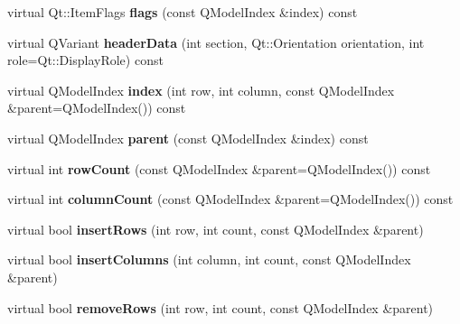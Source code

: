 \begin{DoxyCompactItemize}
virtual Qt\+::\+Item\+Flags {\bfseries flags} (const Q\+Model\+Index \&index) const
\item 
\mbox{\label{class_extendable_item_model_a5ad119a5b156acf0b8ae4090e8ec72ce}} 
virtual Q\+Variant {\bfseries header\+Data} (int section, Qt\+::\+Orientation orientation, int role=Qt\+::\+Display\+Role) const
\item 
\mbox{\label{class_extendable_item_model_ae296561b96cb7d302d27d90a8743e911}} 
virtual Q\+Model\+Index {\bfseries index} (int row, int column, const Q\+Model\+Index \&parent=Q\+Model\+Index()) const
\item 
\mbox{\label{class_extendable_item_model_a5ea988b185fb922797fb153ac284516f}} 
virtual Q\+Model\+Index {\bfseries parent} (const Q\+Model\+Index \&index) const
\item 
\mbox{\label{class_extendable_item_model_a850c9252fb6b59d3e481e564e1c89a60}} 
virtual int {\bfseries row\+Count} (const Q\+Model\+Index \&parent=Q\+Model\+Index()) const
\item 
\mbox{\label{class_extendable_item_model_a25cdc83a4bb99ee802aa1b8533e0775e}} 
virtual int {\bfseries column\+Count} (const Q\+Model\+Index \&parent=Q\+Model\+Index()) const
\item 
\mbox{\label{class_extendable_item_model_adff898fac861b1cc06783b1b5f810d36}} 
virtual bool {\bfseries insert\+Rows} (int row, int count, const Q\+Model\+Index \&parent)
\item 
\mbox{\label{class_extendable_item_model_aa00ea86bd42efb9e82e08da187b6c7ec}} 
virtual bool {\bfseries insert\+Columns} (int column, int count, const Q\+Model\+Index \&parent)
\item 
\mbox{\label{class_extendable_item_model_a066c457590916ebd1fb9e9694415c988}} 
virtual bool {\bfseries remove\+Rows} (int row, int count, const Q\+Model\+Index \&parent)
\item 
\mbox{\label{class_extendable_item_model_a2adfee96dc6e2c8f050c1bba9a4cf170}} 

\end{DoxyCompactItemize}
